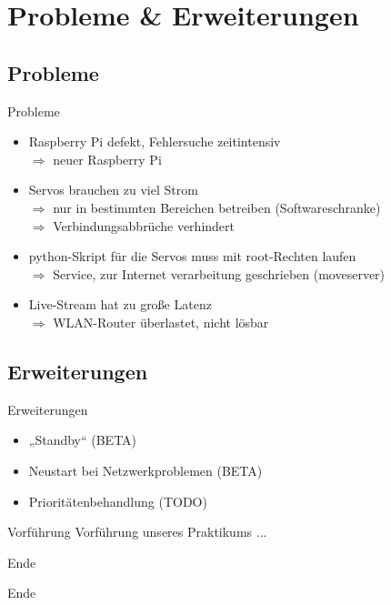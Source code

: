 \documentclass{beamer}
\begin{document}
\section{Probleme \& Erweiterungen}%
\subsection{Probleme}
\begin{frame}{Probleme}
\begin{itemize}
	\item<1-> Raspberry Pi defekt, Fehlersuche zeitintensiv\\
		$\Rightarrow$ neuer Raspberry Pi
	\item<2-> Servos brauchen zu viel Strom\\
		$\Rightarrow$ nur in bestimmten Bereichen betreiben (Softwareschranke)\\
		$\Rightarrow$ Verbindungsabbrüche verhindert
	\item<3-> python-Skript für die Servos muss mit root-Rechten laufen\\
		$\Rightarrow$ Service, zur Internet verarbeitung geschrieben (moveserver)
	\item<4-> Live-Stream hat zu große Latenz\\
		$\Rightarrow$ WLAN-Router überlastet, nicht lösbar
\end{itemize}
\end{frame}


\subsection{Erweiterungen}
\begin{frame}{Erweiterungen}
\begin{itemize}
	\item<1-> „Standby“ (BETA)
	\item<2-> Neustart bei Netzwerkproblemen (BETA)
	\item<3-> Prioritätenbehandlung (TODO)
\end{itemize}
\end{frame}


\begin{frame}{Vorführung}
	Vorführung unseres Praktikums ...
\end{frame}	

\begin{frame}{Ende}
	\begin{center}\huge Ende\end{center}
\end{frame}
\end{document}

